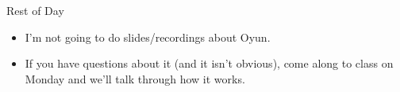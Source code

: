 \documentclass[
  ignorenonframetext,
]{beamer}
\providecommand{\tightlist}{%
  \setlength{\itemsep}{0pt}\setlength{\parskip}{0pt}}
\begin{document}
\begin{frame}{Rest of Day}
\protect\hypertarget{rest-of-day}{}
\begin{itemize}
\tightlist
\item
  I'm not going to do slides/recordings about Oyun.
\item
  If you have questions about it (and it isn't obvious), come along to
  class on Monday and we'll talk through how it works.
\end{itemize}
\end{frame}
\end{document}
